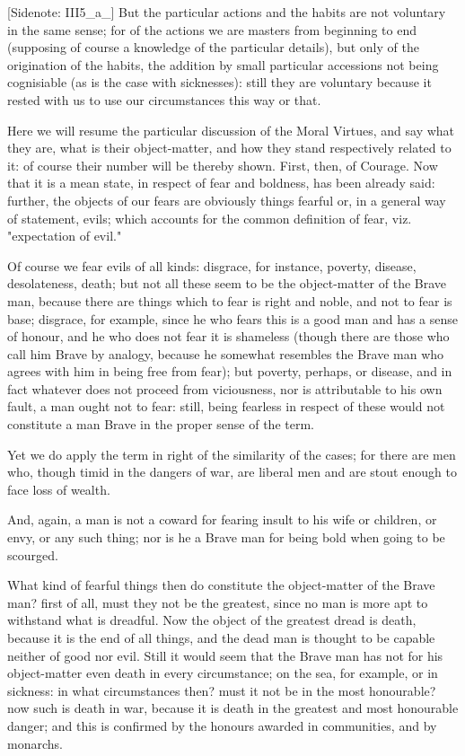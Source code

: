 [Sidenote: III5_a_] But the particular actions and the habits are not
voluntary in the same sense; for of the actions we are masters from
beginning to end (supposing of course a knowledge of the particular
details), but only of the origination of the habits, the addition by
small particular accessions not being cognisiable (as is the case with
sicknesses): still they are voluntary because it rested with us to use
our circumstances this way or that.

Here we will resume the particular discussion of the Moral Virtues,
and say what they are, what is their object-matter, and how they stand
respectively related to it: of course their number will be thereby
shown. First, then, of Courage. Now that it is a mean state, in respect
of fear and boldness, has been already said: further, the objects of our
fears are obviously things fearful or, in a general way of statement,
evils; which accounts for the common definition of fear, viz.
"expectation of evil."

Of course we fear evils of all kinds: disgrace, for instance, poverty,
disease, desolateness, death; but not all these seem to be the
object-matter of the Brave man, because there are things which to fear
is right and noble, and not to fear is base; disgrace, for example,
since he who fears this is a good man and has a sense of honour, and he
who does not fear it is shameless (though there are those who call him
Brave by analogy, because he somewhat resembles the Brave man who agrees
with him in being free from fear); but poverty, perhaps, or disease, and
in fact whatever does not proceed from viciousness, nor is attributable
to his own fault, a man ought not to fear: still, being fearless in
respect of these would not constitute a man Brave in the proper sense of
the term.

Yet we do apply the term in right of the similarity of the cases; for
there are men who, though timid in the dangers of war, are liberal men
and are stout enough to face loss of wealth.

And, again, a man is not a coward for fearing insult to his wife or
children, or envy, or any such thing; nor is he a Brave man for being
bold when going to be scourged.

What kind of fearful things then do constitute the object-matter of the
Brave man? first of all, must they not be the greatest, since no man is
more apt to withstand what is dreadful. Now the object of the greatest
dread is death, because it is the end of all things, and the dead man is
thought to be capable neither of good nor evil. Still it would seem
that the Brave man has not for his object-matter even death in every
circumstance; on the sea, for example, or in sickness: in what
circumstances then? must it not be in the most honourable? now such is
death in war, because it is death in the greatest and most honourable
danger; and this is confirmed by the honours awarded in communities, and
by monarchs.

